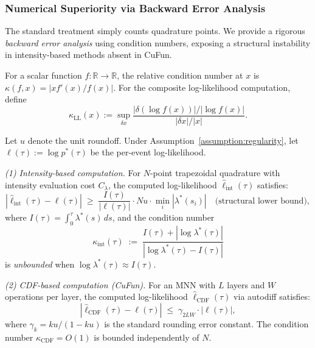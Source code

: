 \subsubsection{Numerical Superiority via Backward Error Analysis}

The standard treatment simply counts quadrature points.
We provide a rigorous \emph{backward error analysis} using condition numbers,
exposing a structural instability in intensity-based methods absent in CuFun.

\begin{definition}
For a scalar function $f: \mathbb{R} \to \mathbb{R}$, the relative condition number
at $x$ is $\kappa(f, x) = |x f'(x)/ f(x)|$.
For the composite log-likelihood computation, define
\[
\kappa_{\text{LL}}(x) := \sup_{\delta x} \frac{|\delta(\log f(x))|/|\log f(x)|}
{|\delta x|/|x|}.
\]
\end{definition}

\begin{theorem}
\label{thm:numerical_superiority}
Let $u$ denote the unit roundoff. Under Assumption~\ref{assumption:regularity},
let $\ell(\tau) := \log p^*(\tau)$ be the per-event log-likelihood.

\emph{(1) Intensity-based computation.}
For $N$-point trapezoidal quadrature with intensity evaluation cost $C_\lambda$,
the computed log-likelihood $\hat{\ell}_{\text{int}}(\tau)$ satisfies:
\[
|\hat{\ell}_{\text{int}}(\tau) - \ell(\tau)|
\;\geq\; \frac{I(\tau)}{|\ell(\tau)|} \cdot N u \cdot \min_i |\lambda^*(s_i)|
\quad \text{(structural lower bound)},
\]
where $I(\tau) = \int_0^\tau \lambda^*(s)\,ds$, and the condition number
\[
\kappa_{\text{int}}(\tau)
\;:=\; \frac{I(\tau) + |\log\lambda^*(\tau)|}{|\log\lambda^*(\tau) - I(\tau)|}
\]
is \emph{unbounded} when $\log\lambda^*(\tau) \approx I(\tau)$.

\emph{(2) CDF-based computation (CuFun).}
For an MNN with $L$ layers and $W$ operations per layer,
the computed log-likelihood $\hat{\ell}_{\text{CDF}}(\tau)$ via autodiff satisfies:
\[
|\hat{\ell}_{\text{CDF}}(\tau) - \ell(\tau)| \;\leq\; \gamma_{2LW} \cdot |\ell(\tau)|,
\]
where $\gamma_k = ku/(1-ku)$ is the standard rounding error constant.
The condition number $\kappa_{\text{CDF}} = O(1)$ is bounded independently of $N$.
\end{theorem}

